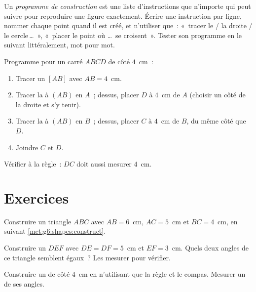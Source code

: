 \begin{method}\label{met:g6:shapes:program}
Un \emph{programme de construction} est une liste d'instructions que
n'importe qui peut suivre pour reproduire une figure exactement.
Écrire une instruction par ligne, nommer chaque point quand il est
créé, et n'utiliser que~: «~tracer le  / la droite / le
cercle\,\dots~», «~placer le point où \dots\ se croisent~». Tester
son programme en le suivant littéralement, mot pour mot.
\end{method}

\begin{example}\label{ex:g6:shapes:program}
Programme pour un carré $ABCD$ de côté $4$~cm~:
\begin{enumerate}
  \item Tracer un  $[AB]$ avec $AB = 4$~cm.
  \item Tracer la  à $(AB)$ en $A$~; dessus, placer
        $D$ à $4$~cm de $A$ (choisir un côté de la droite et s'y
        tenir).
  \item Tracer la  à $(AB)$ en $B$~; dessus, placer
        $C$ à $4$~cm de $B$, du même côté que $D$.
  \item Joindre $C$ et $D$.
\end{enumerate}
Vérifier à la règle~: $DC$ doit aussi mesurer $4$~cm.
\end{example}

\section{Exercices}

\begin{exercise}[$\star$]\label{exo:g6:shapes:1}
Construire un triangle $ABC$ avec $AB = 6$~cm, $AC = 5$~cm et
$BC = 4$~cm, en suivant \cref{met:g6:shapes:construct}.
\end{exercise}

\begin{exercise}[$\star$]\label{exo:g6:shapes:2}
Construire un  $DEF$ avec $DE = DF = 5$~cm et
$EF = 3$~cm. Quels deux angles de ce triangle semblent égaux~? Les
mesurer pour vérifier.
\end{exercise}

\begin{exercise}[$\star$]\label{exo:g6:shapes:3}
Construire un  de côté $4$~cm en n'utilisant que
la règle et le compas. Mesurer un de ses angles.
\end{exercise}

